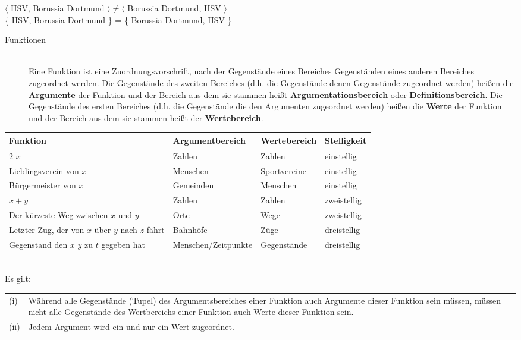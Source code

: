\documentclass{scrartcl}
\begin{document}
$ \langle $ HSV, Borussia Dortmund $ \rangle \neq \langle $ Borussia Dortmund, HSV $ \rangle $ \\
\{ HSV, Borussia Dortmund \} = \{ Borussia Dortmund, HSV \}

\begin{description}
	\item[Funktionen] \mbox{}\\ Eine Funktion ist eine Zuordnungsvorschrift, nach der Gegenstände eines Bereiches Gegenständen eines anderen Bereiches zugeordnet werden. Die Gegenstände des zweiten Bereiches (d.h. die Gegenstände denen Gegenstände zugeordnet werden) heißen die \textbf{Argumente} der Funktion und der Bereich aus dem sie stammen heißt \textbf{Argumentationsbereich} oder \textbf{Definitionsbereich}. Die Gegenstände des ersten Bereiches (d.h. die Gegenstände die den Argumenten zugeordnet werden) heißen die \textbf{Werte} der Funktion und der Bereich aus dem sie stammen heißt der \textbf{Wertebereich}.
\end{description}

\begin{tabularx}{\linewidth}{|X|l|l|l|}
	\hline
	Funktion & Argumentbereich & Wertebereich & Stelligkeit \\
	\hline
	\hline
	2 $ x $ & Zahlen & Zahlen & einstellig \\
	\hline
	Lieblingsverein von $ x $ & Menschen & Sportvereine & einstellig \\
	\hline
	Bürgermeister von $ x $ & Gemeinden & Menschen & einstellig \\
	\hline
	$ x + y $ & Zahlen & Zahlen & zweistellig \\
	\hline
	Der kürzeste Weg zwischen $ x $ und $ y $ & Orte & Wege & zweistellig \\
	\hline
	Letzter Zug, der von $ x $ über $ y $ nach $ z $ fährt & Bahnhöfe & Züge & dreistellig \\
	\hline
	Gegenstand den $ x $ $ y $ zu $ t $ gegeben hat & Menschen/Zeitpunkte & Gegenstände & dreistellig \\
	\hline
\end{tabularx} \\

Es gilt: \\
\begin{tabularx}{\linewidth}{l X}
	(i) & Während alle Gegenstände (Tupel) des Argumentsbereiches einer Funktion auch Argumente dieser Funktion sein müssen, müssen nicht alle Gegenstände des Wertbereichs einer Funktion auch Werte dieser Funktion sein. \\
	(ii) & Jedem Argument wird ein und nur ein Wert zugeordnet.
\end{tabularx} \\
\end{document}
